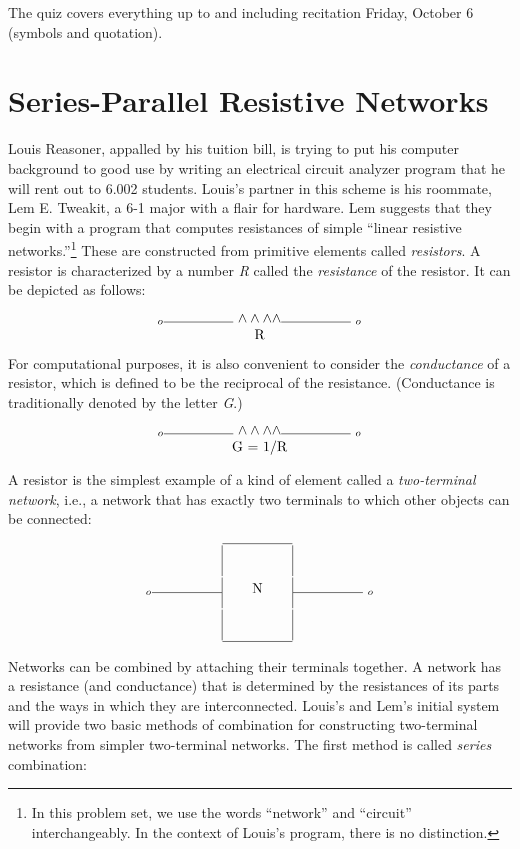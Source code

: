 The quiz covers everything up to and including recitation Friday, October 6
(symbols and quotation).

\mbox{}\hrulefill\mbox{}

\section{Series-Parallel Resistive Networks}

Louis Reasoner, appalled by his tuition bill, is trying to put his computer
background to good use by writing an electrical circuit analyzer program that
he will rent out to 6.002 students.  Louis's partner in this scheme is his
roommate, Lem E. Tweakit, a 6-1 major with a flair for hardware.  Lem suggests
that they begin with a program that computes resistances of simple ``linear
resistive networks.''\footnote{In this problem set, we use the words
``network'' and ``circuit'' interchangeably.  In the context of Louis's
program, there is no distinction.} These are constructed from primitive
elements called {\it resistors}.  A resistor is characterized by a number {\it
R} called the {\it resistance} of the resistor.  It can be depicted as follows:

$$\vbox{\halign{#\cr $_o$\vbox{\hrule width5em} \resistor \vbox{\hrule
width5em} $_o$\cr
\hfil R\hfil\cr}}$$

For computational purposes, it is also convenient to consider the
{\it conductance} of a resistor, which is defined to be the reciprocal of
the resistance. (Conductance is traditionally denoted by the letter
{\it G}.)

$$\vbox{\halign{#\cr
$_o$\vbox{\hrule width5em} \resistor \vbox{\hrule width5em} $_o$\cr
\hfil G = 1/R\hfil\cr}}$$

A resistor is the simplest example of a kind of element called a
{\it two-terminal network}, i.e., a network that has exactly two terminals to
which other objects can be connected:

$$\vbox{\halign{#&#&#&#&#\cr
&&\vbox{\hrule width5em}&&\cr
&\vrule height11pt depth11pt& &\vrule height11pt depth11pt&\cr
$_o$\vbox{\hrule width5em}&\vrule height11pt depth11pt&\hfil N\hfil &\vrule height11pt depth11pt&\vbox{\hrule width5em} $_o$\cr
&\vrule height11pt depth11pt& &\vrule height11pt depth11pt&\cr
&&\vbox{\hrule width5em}&&\cr}}$$


Networks can be combined by attaching their terminals together.  A
network has a resistance (and conductance) that is determined by the
resistances of its parts and the ways in which they are
interconnected.  Louis's and Lem's initial system will provide two
basic methods of combination for constructing two-terminal networks
from simpler two-terminal networks.  The first method is called {\it series}
combination:

